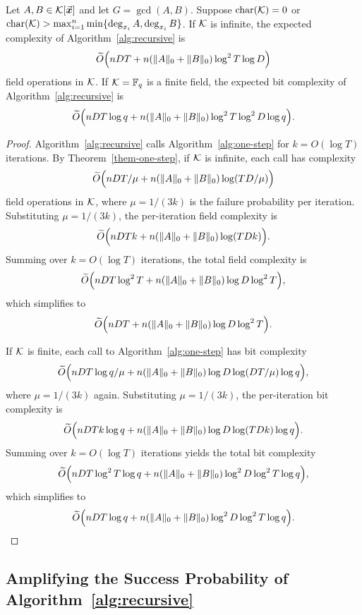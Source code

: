 \documentclass{article}
\numberwithin{equation}{section}
\begin{document}
\begin{theorem}\label{thm:recursive-complexity}
Let $A, B \in {\mathcal{K}}[\vec{\boldsymbol{x}}]$ and let $G = \gcd(A,B)$. Suppose $\operatorname{char}({\mathcal{K}}) = 0$ or $\operatorname{char}({\mathcal{K}}) > \max_{i=1}^n\min\{\deg_{x_i} A,\deg_{x_i} B\}$.
%
If ${\mathcal{K}}$ is infinite, the expected complexity of Algorithm~\ref{alg:recursive} is
\[
\widetilde{O}\Bigl( n D T + n(\|A\|_0 + \|B\|_0) \log^2 T \log D \Bigr)
\]
field operations in ${\mathcal{K}}$.
%
If ${\mathcal{K}} = \mathbb{F}_q$ is a finite field, the expected bit complexity of Algorithm~\ref{alg:recursive}   is
\[
\widetilde{O}\Bigl(
n D T \log q
+ n(\|A\|_0 + \|B\|_0) \log^2 T \log^2 D \log q
\Bigr).
\]



\end{theorem}

\begin{proof}
Algorithm~\ref{alg:recursive} calls Algorithm~\ref{alg:one-step} for $k = O(\log T)$ iterations. By Theorem~\ref{them-one-step}, if ${\mathcal{K}}$ is infinite, each call has complexity
\[
\widetilde{O}\Bigl( n D T / \mu + n(\|A\|_0 + \|B\|_0) \log (TD/\mu) \Bigr)
\]
field operations in ${\mathcal{K}}$, where $\mu = 1/(3k)$ is the failure probability per iteration. Substituting $\mu = 1/(3k)$, the per-iteration field complexity is
\[
\widetilde{O}\Bigl( n D T k + n(\|A\|_0 + \|B\|_0) \log (TDk) \Bigr).
\]
Summing over $k = O(\log T)$ iterations, the total field complexity is
\[
\widetilde{O}\Bigl( n D T \log^2 T + n(\|A\|_0 + \|B\|_0) \log D \log^2 T \Bigr),
\]
which simplifies to
\[
\widetilde{O}\Bigl( n D T + n(\|A\|_0 + \|B\|_0) \log D \log^2 T \Bigr).
\]

If ${\mathcal{K}}$ is finite, each call to Algorithm~\ref{alg:one-step} has bit complexity
\[
\widetilde{O}\Bigl( n D T \log q / \mu + n(\|A\|_0 + \|B\|_0) \log D \log(DT/\mu)\log q \Bigr),
\]
where $\mu = 1/(3k)$ again. Substituting $\mu = 1/(3k)$, the per-iteration bit complexity is
\[
\widetilde{O}\Bigl( n D T k \log q + n(\|A\|_0 + \|B\|_0) \log D \log (TDk)\log q \Bigr).
\]
Summing over $k = O(\log T)$ iterations yields the total bit complexity
\[
\widetilde{O}\Bigl( n D T \log^2 T \log q + n(\|A\|_0 + \|B\|_0) \log^2 D \log^2 T \log q \Bigr),
\]
which simplifies to
\[
\widetilde{O}\Bigl( n D T \log q + n(\|A\|_0 + \|B\|_0) \log^2 D \log^2 T \log q \Bigr).
\]

\end{proof}



\subsection*{Amplifying the Success Probability of Algorithm~\ref{alg:recursive}}
\end{document}
